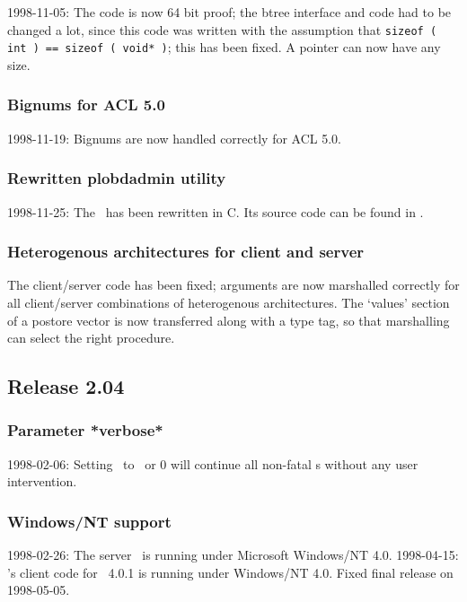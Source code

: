 1998-11-05: The code is now 64 bit proof; the btree interface and code
had to be changed a lot, since this code was written with the
assumption that \texttt{sizeof ( int )}\ \texttt{==}\ \texttt{sizeof (
  void* )}; this has been fixed. A pointer can now have any size.

\subsubsection{Bignums for ACL 5.0}

1998-11-19: Bignums are now handled correctly for ACL 5.0.

\subsubsection{Rewritten plobdadmin utility}

1998-11-25: The \ has been rewritten in C. Its source
code can be found in .

\subsubsection{Heterogenous architectures for client and server}

The client/server code has been fixed; arguments are now marshalled
correctly for all client/server combinations of heterogenous
architectures. The `values' section of a postore vector is now
transferred along with a type tag, so that marshalling can select the
right procedure.

\subsection{Release 2.04}

\subsubsection{Parameter *verbose*}

1998-02-06: Setting \ to \lispnil\ or 0 will continue
all non-fatal s without any user intervention.

\subsubsection{Windows/NT support}

1998-02-26: The server \ is running under Microsoft
Windows/NT 4.0.  1998-04-15: \plobwoexcl's client code for \lwcl\ 
4.0.1 is running under Windows/NT 4.0. Fixed final release on
1998-05-05.

